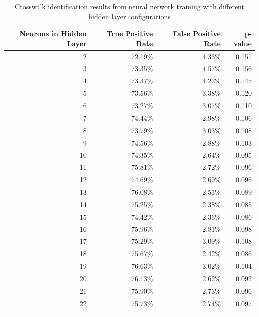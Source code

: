 \documentclass[12pt]{ucthesis}
\begin{document}

\begin{center}
    \begin{longtable}{| r | r | r | r |}
    \hline
    Neurons in Hidden Layer & True Positive Rate & False Positive Rate & p-value \bigstrut\\
    \hline
    2  & 72.19\% & 4.33\% & 0.151 \bigstrut\\
    \hline
    3  & 73.35\% & 4.57\% & 0.156 \bigstrut\\
    \hline
    4  & 73.37\% & 4.22\% & 0.145 \bigstrut\\
    \hline
    5  & 73.56\% & 3.38\% & 0.120 \bigstrut\\
    \hline
    6  & 73.27\% & 3.07\% & 0.110 \bigstrut\\
    \hline
    7  & 74.44\% & 2.98\% & 0.106 \bigstrut\\
    \hline
    8  & 73.79\% & 3.03\% & 0.108 \bigstrut\\
    \hline
    9  & 74.56\% & 2.88\% & 0.103 \bigstrut\\
    \hline
    10 & 74.35\% & 2.64\% & 0.095 \bigstrut\\
    \hline
    11 & 75.81\% & 2.72\% & 0.096 \bigstrut\\
    \hline
    12 & 74.69\% & 2.69\% & 0.096 \bigstrut\\
    \hline
    13 & 76.08\% & 2.51\% & 0.089 \bigstrut\\
    \hline
    14 & 75.25\% & 2.38\% & 0.085 \bigstrut\\
    \hline
    15 & 74.42\% & 2.36\% & 0.086 \bigstrut\\
    \hline
    16 & 75.96\% & 2.81\% & 0.098 \bigstrut\\
    \hline
    17 & 75.29\% & 3.09\% & 0.108 \bigstrut\\
    \hline
    18 & 75.67\% & 2.42\% & 0.086 \bigstrut\\
    \hline
    19 & 76.63\% & 3.02\% & 0.104 \bigstrut\\
    \hline
    20 & 76.13\% & 2.62\% & 0.092 \bigstrut\\
    \hline
    21 & 75.90\% & 2.73\% & 0.096 \bigstrut\\
    \hline
    22 & 75.73\% & 2.74\% & 0.097 \bigstrut\\
    \hline

    \hline
    \caption{Crosswalk identification results from neural network training with different hidden layer configurations}
    \label{tab:NN-HiddenLayersResults} 
    \end{longtable}
\end{center}
\end{document}
